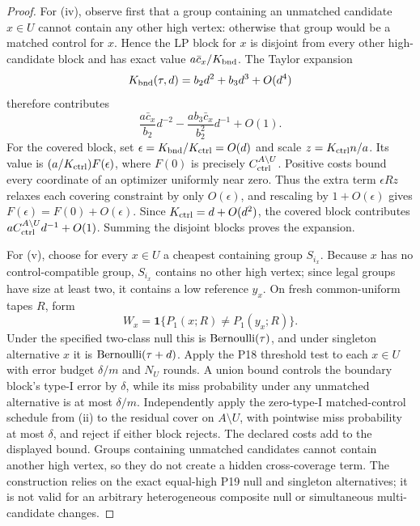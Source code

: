 \begin{proof}
For (iv), observe first that a group containing an unmatched candidate
\(x\in U\) cannot contain any other high vertex: otherwise that group would be
a matched control for \(x\).  Hence the LP block for \(x\) is disjoint from
every other high-candidate block and has exact value
\(a\bar c_x/K_{\rm bnd}\).  The Taylor expansion
\begin{equation}\label{eq:formal-results-069}
K_{\rm bnd}(\tau,d)=b_2d^2+b_3d^3+O(d^4)
\end{equation}
therefore contributes
\begin{equation}\label{eq:formal-results-070}
\frac{a\bar c_x}{b_2}d^{-2}
-\frac{ab_3\bar c_x}{b_2^2}d^{-1}+O(1).
\end{equation}
For the covered block, set
\(\epsilon=K_{\rm bnd}/K_{\rm ctrl}=O(d)\) and scale
\(z=K_{\rm ctrl}n/a\).  Its value is
\((a/K_{\rm ctrl})F(\epsilon)\), where \(F(0)\) is precisely
\(C_{\rm ctrl}^{A\setminus U}\).  Positive costs bound every coordinate of
an optimizer uniformly near zero.  Thus the extra term
\(\epsilon Rz\) relaxes each covering constraint by only \(O(\epsilon)\),
and rescaling by \(1+O(\epsilon)\) gives
\(F(\epsilon)=F(0)+O(\epsilon)\).  Since
\(K_{\rm ctrl}=d+O(d^2)\), the covered block contributes
\(aC_{\rm ctrl}^{A\setminus U}d^{-1}+O(1)\).  Summing the disjoint blocks
proves the expansion.

For (v), choose for every \(x\in U\) a cheapest containing group
\(S_{i_x}\).  Because \(x\) has no control-compatible group,
\(S_{i_x}\) contains no other high vertex; since legal groups have size at
least two, it contains a low reference \(y_x\).  On fresh common-uniform
tapes \(R\), form
\begin{equation}\label{eq:formal-results-071}
W_x=\mathbf 1\{P_1(x;R)\ne P_1(y_x;R)\}.
\end{equation}
Under the specified two-class null this is \({\rm Bernoulli}(\tau)\), and under
singleton alternative \(x\) it is \({\rm Bernoulli}(\tau+d)\).  Apply the
P18 threshold test to each \(x\in U\) with error budget \(\delta/m\) and
\(N_U\) rounds.  A union bound controls the boundary block's type-I error by
\(\delta\), while its miss probability under any unmatched alternative is at
most \(\delta/m\).  Independently apply the zero-type-I matched-control
schedule from (ii) to the residual cover on \(A\setminus U\), with pointwise
miss probability at most \(\delta\), and reject if either block rejects.
The declared costs add to the displayed bound.  Groups containing unmatched
candidates cannot contain another high vertex, so they do not create a hidden
cross-coverage term.  The construction relies on the exact equal-high P19 null
and singleton alternatives; it is not valid for an arbitrary heterogeneous
composite null or simultaneous multi-candidate changes.


\end{proof}
